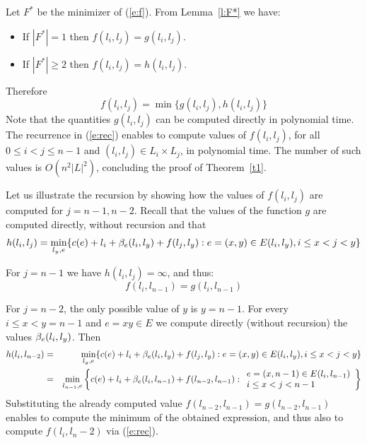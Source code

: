 \documentclass[a4paper,UKenglish,autoref]{lipics-v2019}
\begin{document}
Let $F^*$ be the minimizer of (\ref{e:f}). From Lemma~\ref{l:F*} we have:
\begin{itemize}
\item
If $|F^*|=1$ then $f(l_i,l_j)=g(l_i,l_j)$.
\item
If $|F^*|\geq 2$ then $f(l_i,l_j)=h(l_i,l_j)$.
\end{itemize}
Therefore
\begin{equation} \label{e:rec}
f(l_i,l_j)=\min\{g(l_i,l_j),h(l_i,l_j)\}
\end{equation}
Note that the quantities $g(l_i,l_j)$ can be computed directly in polynomial time. 
The recurrence in (\ref{e:rec}) enables to compute values of $f(l_i,l_j)$, 
for all $0 \leq i< j \leq n-1$ and $(l_i,l_j) \in L_i \times L_j$, in polynomial time.  
The number of such values is $O(n^2 |L|^2)$, concluding the proof of Theorem~\ref{t1}. 

\medskip

Let us illustrate the recursion by showing how the values of $f(l_i,l_j)$ are computed for $j=n-1,n-2$. 
Recall that the values of the function $g$ are computed directly, without recursion and that
\[
h(l_i,l_j) =  \min_{l_y,e}\{c(e)+l_i+\beta_e(l_i,l_y)+f(l_j,l_y):  e=(x,y) \in E(l_i,l_y), i \leq x <j<y\}
\]

For $j=n-1$ we have $h(l_i,l_j)=\infty$, and thus:
\[
f(l_i,l_{n-1}) =g(l_i,l_{n-1})
\]

\medskip

For $j=n-2$, the only possible value of $y$ is $y= n-1$.
For every $i \leq x <y=n-1$ and $e=xy \in E$ we compute directly (without recursion) the values $\beta_e(l_i,l_y)$.
Then
\begin{eqnarray*} \displaystyle 
h(l_i,l_{n-2}) & = & \min_{l_y,e}\{c(e)+l_i+\beta_e(l_i,l_y)+f(l_j,l_y): e=(x,y) \in E(l_i,l_y), i \leq x <j<y\} \\
                      & = & \min_{l_{n-1},e} \left\{ c(e)+l_i+\beta_e(l_i,l_{n-1})+f(l_{n-2},l_{n-1}): \begin{array}{ll}
                                                                                                                                               e=(x,n-1) \in E(l_i,l_{n-1}) \\
                                                                                                                                                i \leq x <j<n-1
																																																																							  \end{array} \right\}
\end{eqnarray*}
Substituting the already computed value $f(l_{n-2},l_{n-1}) =g(l_{n-2},l_{n-1})$ enables to compute the minimum
of the obtained expression, and thus also to compute $f(l_i, l_n-2)$ via (\ref{e:rec}). 
\end{document}
